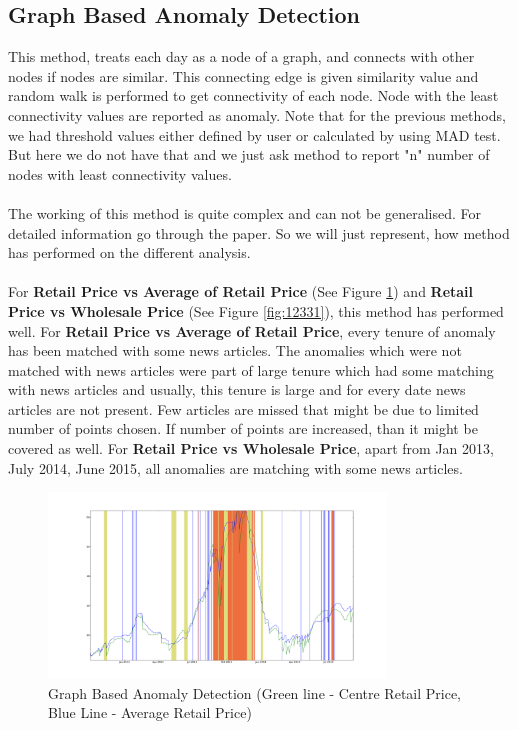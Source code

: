 \documentclass[a4paper,10pt]{report}
\begin{document}
\subsection{Graph Based Anomaly Detection}

	This method, treats each day as a node of a graph, and connects with other nodes if nodes are similar. This connecting edge is given similarity value and random walk is performed to get connectivity of each node. Node with the least connectivity values are reported as anomaly. Note that for the previous methods, we had threshold values either defined by user or calculated by using MAD test. But here we do not have that and we just ask method to report "n" number of nodes with least connectivity values.\\
	\\
	The working of this method is quite complex and can not be generalised. For detailed information go through the paper. So we will just represent, how method has performed on the different analysis.\\
	\\
	For \textbf{Retail Price vs Average of Retail Price} (See Figure \ref{fig:1231}) and \textbf{Retail Price vs Wholesale Price} (See Figure \ref{fig:12331}), this method has performed well. For \textbf{Retail Price vs Average of Retail Price}, every tenure of anomaly has been matched with some news articles. The anomalies which were not matched with news articles were part of large tenure which had some matching with news articles and usually, this tenure is large and for every date news articles are not present. Few articles are missed that might be due to limited number of points chosen. If number of points are increased, than it might be covered as well. For \textbf{Retail Price vs Wholesale Price}, apart from Jan 2013, July 2014, June 2015, all anomalies are matching with some news articles.\\
			\begin{figure}[H]
		    	\centering
  		    	\includegraphics[width=0.8\textwidth]{graphs/1231.png}
		    	\caption{Graph Based Anomaly Detection (Green line - Centre Retail Price, Blue Line - Average Retail Price)}
		    	\label{fig:1231}
			\end{figure}
			
\end{document}
